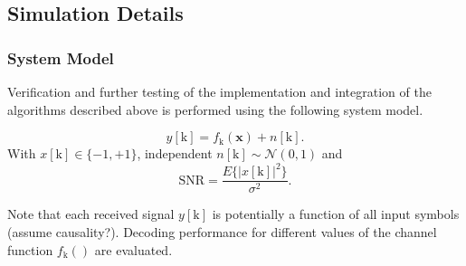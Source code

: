 \documentclass[12pt,a4paper]{report}
\begin{document}
\subsection{Simulation Details}
\subsubsection{System Model}
Verification and further testing of the implementation and integration of the algorithms described above is performed using the following system model.

%

\begin{equation*}
y[\text{k}] = f_{\text{k}}(\mathbf{x}) + n[\text{k}].
\end{equation*}
With $x[\text{k}] \in \{ -1, +1\}$, independent $n[\text{k}]\sim \mathcal{N}(0,1)$ and 
\begin{equation*}
\text{SNR} = \frac{E\{|x[\text{k}]|^2\}}{\sigma^2}.
\end{equation*}

Note that each received signal $y[\text{k}] $ is potentially a function of all input symbols (assume causality?). Decoding performance for different values of the channel function $f_{\text{k}}()$ are evaluated. 
\end{document}
